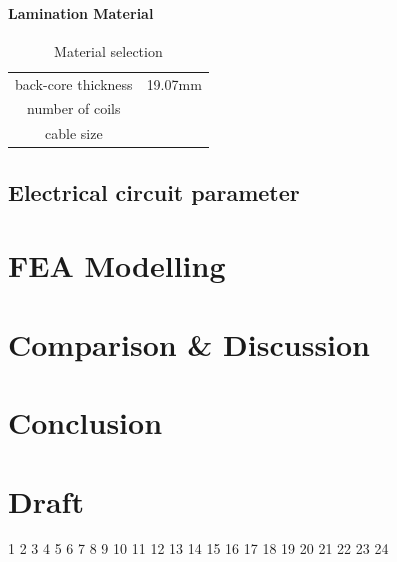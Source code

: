 \documentclass [a4 paper, 11pt, titlepage] {article}
\begin{document}
	\paragraph{Lamination Material}
	
	
	\begin{table}[h]
		\begin{center}
			\begin{tabular}{c|c}
				 &  \\
				\hline
				back-core thickness & 19.07mm \\
				number of coils & \\
				cable size & 
			\end{tabular}
		\end{center}
		\caption{Material selection}
		\label{tab:materialSelection}
	\end{table}
	
	
	
	
	
	
	
	
	\subsection{Electrical circuit parameter}
	
	

	

	

	

	
	
	
	
	
	
	
	
	\section{FEA Modelling}
	\section{Comparison \& Discussion}
	\section{Conclusion}


	\section{Draft}
	1\cite{alberti_theory_2011}
	2\cite{babitsky_investigation_2019}
	3\cite{boglietti_electrical_2014}
	4\cite{carraro_design_2018}
	5\cite{choi_reduction_2016}
	6\cite{dajaku_advanced_2019}
	7\cite{el-refaie_advanced_2014}
	8\cite{el-refaie_fractional-slot_2010}
	9\cite{el-refaie_fractional-slot_2013}
	10\cite{farshadnia_advanced_2018}
	11\cite{farshadnia_detailed_2016}
	12\cite{geun-ho_lee_torque_2008}
	13\cite{guemes_comparative_2010}
	14\cite{han_torque_2007}
	15\cite{he_evaluation_2019}
	16\cite{howell_getting_2018}
	17\cite{jussila_guidelines_2007}
	18\cite{masmoudi_design_2019}
	19\cite{reddy_generalized_2014}
	20\cite{seok-hee_han_torque_2010}
	21\cite{yokoi_general_2016}
	22\cite{zhu_analysis_2018}
	23\cite{zhu_novel_2019}
	24\cite{zuopeng_design_2017}
	\newpage
	
	 
	
\end{document}
